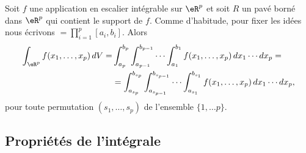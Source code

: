 \begin{proposition}
	Soit \( f\) une application en escalier intégrable sur \( \eR^p\) et soit \( R\) un pavé borné dans \( \eR^p\) qui contient le support de \( f\). Comme d'habitude, pour fixer les idées nous écrivons \( =\prod_{i=1}^p[a_i,b_i]\). Alors
	\begin{equation}
		\begin{aligned}
			\int_{\eR^p}f(x_1,\ldots, x_p) \, dV = & \int_{a_p}^{b_p}\int_{a_{p-1}}^{b_{p-1}}\cdots\int_{a_1}^{b_1} f(x_1,\ldots, x_p) \, dx_1\cdots dx_p=                          \\
			                                       & =\int_{a_{s_p}}^{b_{s_p}}\int_{a_{s_{p-1}}}^{b_{s_{p-1}}}\cdots\int_{a_{s_1}}^{b_{s_1}} f(x_1,\ldots, x_p) \, dx_1\cdots dx_p,
		\end{aligned}
	\end{equation}
	pour toute permutation \( (s_1,\ldots,s_p)\) de l'ensemble \( \{1,\ldots p\}\).
\end{proposition}

\subsection{Propriétés de l'intégrale}

